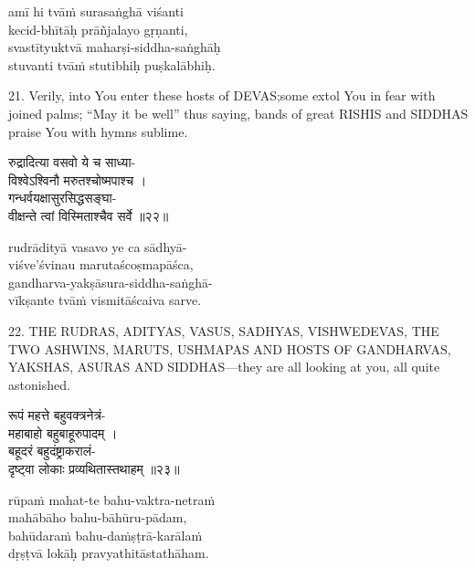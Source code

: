 \begin{transliteration}
amī hi tvāṁ surasaṅghā viśanti \\
\tab kecid-bhītāḥ prāñjalayo gṛṇanti, \\
svastītyuktvā maharṣi-siddha-saṅghāḥ \\
\tab stuvanti tvāṁ stutibhiḥ puṣkalābhiḥ.
\end{transliteration}

21. Verily, into You enter these hosts of DEVAS;\@ some extol You in fear with
joined palms; ``May it be well'' thus saying, bands of great RISHIS and SIDDHAS
praise You with hymns sublime.

\begin{gitaverse}
रुद्रादित्या वसवो ये च साध्या- \\
\tab विश्वेऽश्विनौ मरुतश्चोष्मपाश्च । \\
गन्धर्वयक्षासुरसिद्धसङ्घा- \\
\tab वीक्षन्ते त्वां विस्मिताश्चैव सर्वे ॥२२॥
\end{gitaverse}

\begin{transliteration}
rudrādityā vasavo ye ca sādhyā- \\
\tab viśve'śvinau marutaścoṣmapāśca, \\
gandharva-yakṣāsura-siddha-saṅghā- \\
\tab vīkṣante tvāṁ vismitāścaiva sarve.
\end{transliteration}

22. THE RUDRAS, ADITYAS, VASUS, SADHYAS, VISHWEDEVAS, THE TWO ASHWINS, MARUTS,
USHMAPAS AND HOSTS OF GANDHARVAS, YAKSHAS, ASURAS AND SIDDHAS---they are all
looking at you, all quite astonished.

\begin{gitaverse}
रूपं महत्ते बहुवक्त्रनेत्रं- \\
\tab महाबाहो बहुबाहूरुपादम् । \\
बहूदरं बहुदंष्ट्राकरालं- \\
\tab दृष्ट्वा लोकाः प्रव्यथितास्तथाहम् ॥२३॥
\end{gitaverse}

\begin{transliteration}
rūpaṁ mahat-te bahu-vaktra-netraṁ \\
\tab mahābāho bahu-bāhūru-pādam, \\
bahūdaraṁ bahu-daṁṣṭrā-karālaṁ \\
\tab dṛṣṭvā lokāḥ pravyathitāstathāham.
\end{transliteration}


